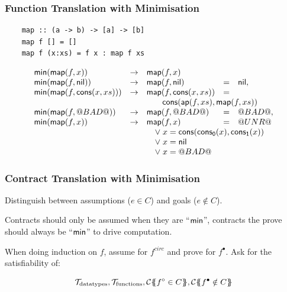 \documentclass[serif,professionalfont]{beamer}
\begin{document}
\begin{frame}[fragile]
  \frametitle{Function Translation with Minimisation}

  \begin{verbatim}
    map :: (a -> b) -> [a] -> [b]
    map f [] = []
    map f (x:xs) = f x : map f xs
  \end{verbatim}

  \newcommand\mmap[2]{
    \Min(\map{#1}{#2}) & \to & \map{#1}{#2}
  }

  \[\begin{array}{lllll}
  \Min(\map{f}{x}) & \to & \map{f}{x} & & \\
  \mmap{f}{\nil}         & = & \nil, \\
  \mmap{f}{\cons{x}{xs}} & = & \\
  & & \multicolumn{3}{c}{\cons{\app{f}{xs}}{\map{f}{xs}}}  \\
  \mmap{f}{\bad}         & = & \bad, \\
  \mmap{f}{x}            & = & \unr \\
  & & \multicolumn{3}{l}{\quad \lor \; x = \cons{\conspi{x}}{\conspii{x}}} \\
  & & \multicolumn{3}{l}{\quad \lor \; x = \nil} \\
  & & \multicolumn{3}{l}{\quad \lor \; x = \bad} \\
  \end{array}\]
\end{frame}

\begin{frame}[fragile]
  \frametitle{Contract Translation with Minimisation}

  Distinguish between assumptions ($e \in C$) and goals ($e \notin C$).

  Contracts should only be assumed
  when they are ``$\mathsf{min}$'', contracts the prove should always be
  ``$\mathsf{min}$'' to drive computation.

  When doing induction on $f$, assume for $f^{circ}$ and prove for
  $f^\bullet$. Ask for the satisfiability of:

  $$
    \mathcal{T}_{\text{datatypes}}, \mathcal{T}_{\text{functions}} ,
    \trc{f^\circ \in C},
    \trc{f^\bullet \notin C}
  $$
\end{frame}
\end{document}
